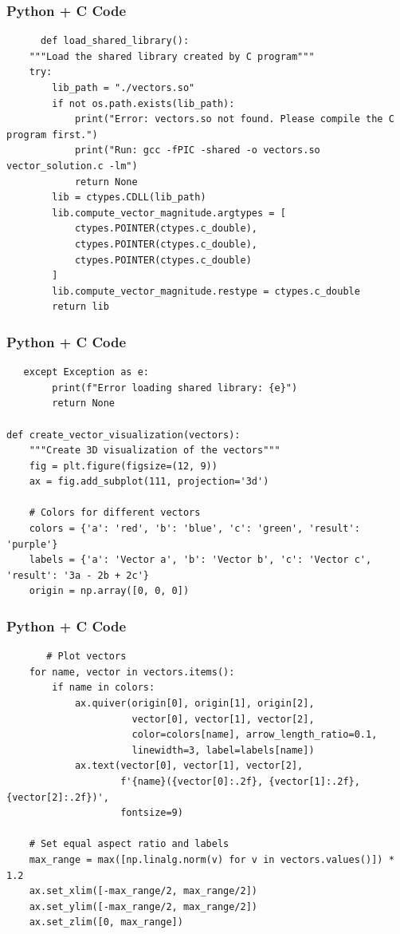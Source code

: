 \documentclass{beamer}
\begin{document}
\begin{frame}[fragile]
    \frametitle{Python + C Code}
    \begin{lstlisting}   
      def load_shared_library():
    """Load the shared library created by C program"""
    try:
        lib_path = "./vectors.so"
        if not os.path.exists(lib_path):
            print("Error: vectors.so not found. Please compile the C program first.")
            print("Run: gcc -fPIC -shared -o vectors.so vector_solution.c -lm")
            return None
        lib = ctypes.CDLL(lib_path)
        lib.compute_vector_magnitude.argtypes = [
            ctypes.POINTER(ctypes.c_double),
            ctypes.POINTER(ctypes.c_double),
            ctypes.POINTER(ctypes.c_double)
        ]
        lib.compute_vector_magnitude.restype = ctypes.c_double
        return lib
    \end{lstlisting}
\end{frame}

\begin{frame}[fragile]
    \frametitle{Python + C Code}
    \begin{lstlisting}
   except Exception as e:
        print(f"Error loading shared library: {e}")
        return None

def create_vector_visualization(vectors):
    """Create 3D visualization of the vectors"""
    fig = plt.figure(figsize=(12, 9))
    ax = fig.add_subplot(111, projection='3d')

    # Colors for different vectors
    colors = {'a': 'red', 'b': 'blue', 'c': 'green', 'result': 'purple'}
    labels = {'a': 'Vector a', 'b': 'Vector b', 'c': 'Vector c', 'result': '3a - 2b + 2c'}
    origin = np.array([0, 0, 0])
    \end{lstlisting}
\end{frame}

\begin{frame}[fragile]
    \frametitle{Python + C Code}
    \begin{lstlisting}
       # Plot vectors
    for name, vector in vectors.items():
        if name in colors:
            ax.quiver(origin[0], origin[1], origin[2],
                      vector[0], vector[1], vector[2],
                      color=colors[name], arrow_length_ratio=0.1,
                      linewidth=3, label=labels[name])
            ax.text(vector[0], vector[1], vector[2],
                    f'{name}({vector[0]:.2f}, {vector[1]:.2f}, {vector[2]:.2f})',
                    fontsize=9)

    # Set equal aspect ratio and labels
    max_range = max([np.linalg.norm(v) for v in vectors.values()]) * 1.2
    ax.set_xlim([-max_range/2, max_range/2])
    ax.set_ylim([-max_range/2, max_range/2])
    ax.set_zlim([0, max_range])
    \end{lstlisting}
\end{frame}
\end{document}
